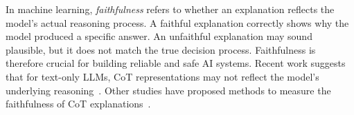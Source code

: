 \documentclass{Interspeech}
\begin{document}
In machine learning, \textit{faithfulness} refers to whether an explanation reflects the model’s actual reasoning process. A faithful explanation correctly shows why the model produced a specific answer. An unfaithful explanation may sound plausible, but it does not match the true decision process. Faithfulness is therefore crucial for building reliable and safe AI systems. Recent work suggests that for text-only LLMs, CoT representations may not reflect the model’s underlying reasoning~\cite{turpin2023languagemodelsdontsay,barez-chain-2025,arcuschin2025chainofthoughtreasoningwildfaithful,chen2023modelsexplainthemselvescounterfactual}. Other studies have proposed methods to measure the faithfulness of CoT explanations~\cite{lanham2023measuringfaithfulnesschainofthoughtreasoning,arcuschin2025chainofthoughtreasoningwildfaithful,matton2025walktalkmeasuringfaithfulness,huang2023largelanguagemodelsexplain,madsen2024selfexplanationslargelanguagemodels}.
\end{document}
